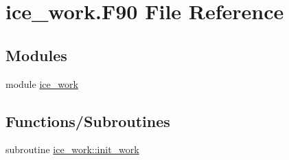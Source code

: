 \hypertarget{ice__work_8F90}{
\section{ice\_\-work.F90 File Reference}
\label{ice__work_8F90}
}
\subsection*{Modules}
\begin{DoxyCompactItemize}
\item 
module \hyperlink{namespaceice__work}{ice\_\-work}
\end{DoxyCompactItemize}
\subsection*{Functions/Subroutines}
\begin{DoxyCompactItemize}
\item 
subroutine \hyperlink{namespaceice__work_af0fa69c909e63b58400ba8f31ab81a4b}{ice\_\-work::init\_\-work}
\end{DoxyCompactItemize}
